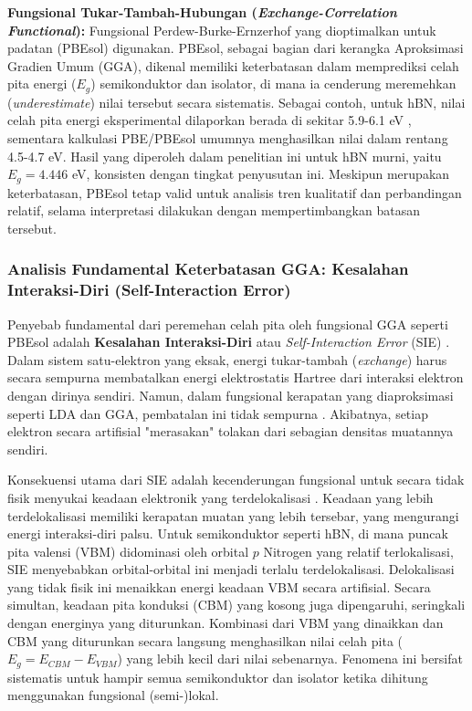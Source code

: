 \textbf{Fungsional Tukar-Tambah-Hubungan (\textit{Exchange-Correlation Functional}):} Fungsional Perdew-Burke-Ernzerhof yang dioptimalkan untuk padatan (PBEsol) \citep{Perdew2008} digunakan. PBEsol, sebagai bagian dari kerangka Aproksimasi Gradien Umum (GGA), dikenal memiliki keterbatasan dalam memprediksi celah pita energi ($E_g$) semikonduktor dan isolator, di mana ia cenderung meremehkan (\textit{underestimate}) nilai tersebut secara sistematis. Sebagai contoh, untuk hBN, nilai celah pita energi eksperimental dilaporkan berada di sekitar 5.9-6.1 eV \citep{Watanabe2004, Elias2019}, sementara kalkulasi PBE/PBEsol umumnya menghasilkan nilai dalam rentang 4.5-4.7 eV. Hasil yang diperoleh dalam penelitian ini untuk hBN murni, yaitu $E_g = 4.446$ eV, konsisten dengan tingkat penyusutan ini. Meskipun merupakan keterbatasan, PBEsol tetap valid untuk analisis tren kualitatif dan perbandingan relatif, selama interpretasi dilakukan dengan mempertimbangkan batasan tersebut.

\subsubsection{Analisis Fundamental Keterbatasan GGA: Kesalahan Interaksi-Diri (Self-Interaction Error)}
Penyebab fundamental dari peremehan celah pita oleh fungsional GGA seperti PBEsol adalah \textbf{Kesalahan Interaksi-Diri} atau \textit{Self-Interaction Error} (SIE) \citep{Perdew1981, MoriSanchez2008}. Dalam sistem satu-elektron yang eksak, energi tukar-tambah (\textit{exchange}) harus secara sempurna membatalkan energi elektrostatis Hartree dari interaksi elektron dengan dirinya sendiri. Namun, dalam fungsional kerapatan yang diaproksimasi seperti LDA dan GGA, pembatalan ini tidak sempurna \citep{Cohen2008}. Akibatnya, setiap elektron secara artifisial "merasakan" tolakan dari sebagian densitas muatannya sendiri.

Konsekuensi utama dari SIE adalah kecenderungan fungsional untuk secara tidak fisik menyukai keadaan elektronik yang terdelokalisasi \citep{MoriSanchez2008, Cohen2012}. Keadaan yang lebih terdelokalisasi memiliki kerapatan muatan yang lebih tersebar, yang mengurangi energi interaksi-diri palsu. Untuk semikonduktor seperti hBN, di mana puncak pita valensi (VBM) didominasi oleh orbital $p$ Nitrogen yang relatif terlokalisasi, SIE menyebabkan orbital-orbital ini menjadi terlalu terdelokalisasi. Delokalisasi yang tidak fisik ini menaikkan energi keadaan VBM secara artifisial. Secara simultan, keadaan pita konduksi (CBM) yang kosong juga dipengaruhi, seringkali dengan energinya yang diturunkan. Kombinasi dari VBM yang dinaikkan dan CBM yang diturunkan secara langsung menghasilkan nilai celah pita ($E_g = E_{CBM} - E_{VBM}$) yang lebih kecil dari nilai sebenarnya. Fenomena ini bersifat sistematis untuk hampir semua semikonduktor dan isolator ketika dihitung menggunakan fungsional (semi-)lokal.

